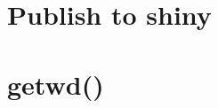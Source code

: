 \documentclass[12pt,]{article}
\begin{document}
\hypertarget{publish-to-shiny}{%
\section{Publish to shiny}\label{publish-to-shiny}}

\hypertarget{getwd}{%
\section{getwd()}\label{getwd}}
\end{document}
